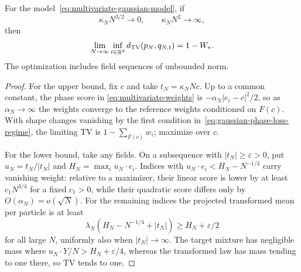 \begin{theorem}
\label{thm:gaussian-phase-loss}
For the model~\eqref{eq:multivariate-gaussian-model}, if
\begin{equation}
 \kappa_NN^{3/2}\to0,\qquad \kappa_NN^2\to\infty,
 \label{eq:gaussian-phase-loss-regime}
\end{equation}
then
\begin{equation}
 \lim_{N\to\infty}\inf_{t\in\mathbb R^d}d_{\mathrm{TV}}(p_N,q_{N,t})=1-W_*.
 \label{eq:gaussian-phase-loss-optimum}
\end{equation}
The optimization includes field sequences of unbounded norm.
\end{theorem}
\begin{proof}
For the upper bound, fix $c$ and take $t_N=\kappa_NNc$. Up to a
common constant, the phase score in \eqref{eq:multivariate-weights}
is $-\alpha_N|e_i-c|^2/2$, so as $\alpha_N\to\infty$ the weights
converge to the reference weights conditioned on $F(c)$. With shape
changes vanishing by the first condition
in~\eqref{eq:gaussian-phase-loss-regime}, the limiting TV is
$1-\sum_{F(c)}w_i$; maximize over $c$.

For the lower bound, take any fields. On a subsequence with
$|t_N|\ge\varepsilon>0$, put $u_N=t_N/|t_N|$ and
$H_N=\max_i u_N\cdot e_i$. Indices with
$u_N\cdot e_i<H_N-N^{-1/4}$ carry vanishing weight: relative to a
maximizer, their linear score is lower by at least $c_1N^{3/4}$ for a
fixed $c_1>0$, while their quadratic score differs only by
$O(\alpha_N)=o(\sqrt N)$.
For the remaining indices the projected transformed mean per particle
is at least
\[
 \lambda_N(H_N-N^{-1/4}+|t_N|)\ge H_N+\varepsilon/2
\]
for all large $N$, uniformly also when $|t_N|\to\infty$.
The target mixture has negligible mass where
$u_N\cdot Y/N>H_N+\varepsilon/4$, whereas the transformed law has
mass tending to one there, so TV tends to one.


\end{proof}
